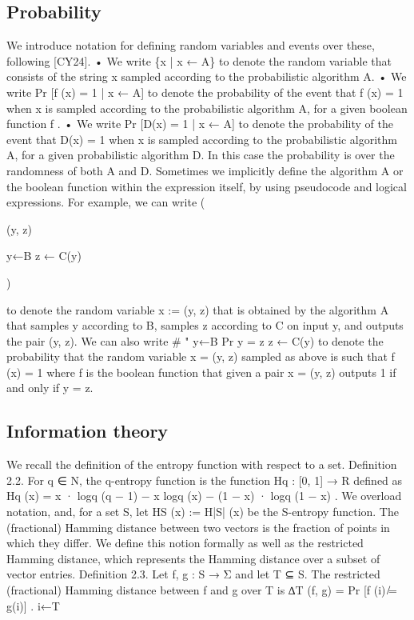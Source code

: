 \documentclass[11pt]{article}
\begin{document}
\subsection{Probability}



We introduce notation for defining random variables and events over these, following [CY24].
• We write \{x | x ← A\} to denote the random variable that consists of the string x sampled
according to the probabilistic algorithm A.
• We write Pr [f (x) = 1 | x ← A] to denote the probability of the event that f (x) = 1 when x is
sampled according to the probabilistic algorithm A, for a given boolean function f .
• We write Pr [D(x) = 1 | x ← A] to denote the probability of the event that D(x) = 1 when x is
sampled according to the probabilistic algorithm A, for a given probabilistic algorithm D. In
this case the probability is over the randomness of both A and D.
Sometimes we implicitly define the algorithm A or the boolean function within the expression itself,
by using pseudocode and logical expressions. For example, we can write
(

(y, z)

y←B
z ← C(y)

)

to denote the random variable x := (y, z) that is obtained by the algorithm A that samples y
according to B, samples z according to C on input y, and outputs the pair (y, z). We can also
write
\#
"
y←B
Pr y = z
z ← C(y)
to denote the probability that the random variable x = (y, z) sampled as above is such that f (x) = 1
where f is the boolean function that given a pair x = (y, z) outputs 1 if and only if y = z.


\subsection{Information theory}



We recall the definition of the entropy function with respect to a set.
Definition 2.2. For q ∈ N, the q-entropy function is the function Hq : [0, 1] → R defined as
Hq (x) = x · logq (q − 1) − x logq (x) − (1 − x) · logq (1 − x) .
We overload notation, and, for a set S, let HS (x) := H|S| (x) be the S-entropy function.
The (fractional) Hamming distance between two vectors is the fraction of points in which they
differ. We define this notion formally as well as the restricted Hamming distance, which represents
the Hamming distance over a subset of vector entries.
Definition 2.3. Let f, g : S → Σ and let T ⊆ S. The restricted (fractional) Hamming
distance between f and g over T is
∆T (f, g) = Pr [f (i) ̸= g(i)] .
i←T
\end{document}
